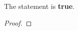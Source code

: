 \documentclass[
  coursecode={MTHE 474},
  assignmentname={Homework \homeworknumber},
  studentnumber=20053722,
  name={Bryan Hoang},
  draft,
]{
  ltxanswer%
}
\begin{document}
\begin{questions}
\begin{parts}
      \part{}
      \begin{solution}
        \begin{claim}
          The statement is \textbf{true}.
        \end{claim}
        \begin{proof}
        \end{proof}
      \end{solution}
    \end{parts}
  \end{questions}
\end{document}
